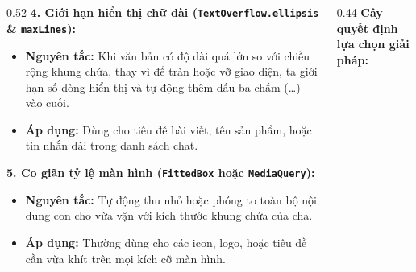\documentclass[aspectratio=169, 10pt]{beamer}
\newcommand{\SlideHeader}[2]{%
  \noindent{\textcolor{AccentOrange}{\textbf{\footnotesize #1}}}\\[0.08cm]
  \noindent{\Large \textbf{\textcolor{NavyTitle}{#2}}}\\[0.22cm]
}
\begin{document}
\begin{frame}
  \SlideHeader{CƠ SỞ LÝ THUYẾT}{Chi Tiết Các Cách Xử Lý Overflow (Phần 2)}

  \begin{columns}[T]
    \begin{column}{0.52\textwidth}
      \textbf{4. Giới hạn hiển thị chữ dài (\texttt{TextOverflow.ellipsis} \& \texttt{maxLines}):}
      \begin{itemize}
        \item \textbf{Nguyên tắc:} Khi văn bản có độ dài quá lớn so với chiều rộng khung chứa, thay vì để tràn hoặc vỡ giao diện, ta giới hạn số dòng hiển thị và tự động thêm dấu ba chấm (\dots) vào cuối.
        \item \textbf{Áp dụng:} Dùng cho tiêu đề bài viết, tên sản phẩm, hoặc tin nhắn dài trong danh sách chat.
      \end{itemize}

      \vspace{0.25cm}
      \textbf{5. Co giãn tỷ lệ màn hình (\texttt{FittedBox} hoặc \texttt{MediaQuery}):}
      \begin{itemize}
        \item \textbf{Nguyên tắc:} Tự động thu nhỏ hoặc phóng to toàn bộ nội dung con cho vừa vặn với kích thước khung chứa của cha.
        \item \textbf{Áp dụng:} Thường dùng cho các icon, logo, hoặc tiêu đề cần vừa khít trên mọi kích cỡ màn hình.
      \end{itemize}
    \end{column}

    \begin{column}{0.44\textwidth}
      \centering
      \textbf{Cây quyết định lựa chọn giải pháp:}\\[0.2cm]
\end{column}
\end{columns}
\end{frame}
\end{document}
